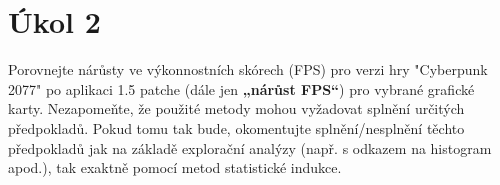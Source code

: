 \section*{Úkol 2}
\label{sec:task-2}

Porovnejte nárůsty ve výkonnostních skórech (FPS) pro verzi hry "Cyberpunk 2077" po aplikaci 1.5 patche (dále jen \textbf{„nárůst FPS“}) 
pro vybrané grafické karty. Nezapomeňte, že použité metody mohou vyžadovat splnění určitých předpokladů. Pokud tomu tak bude, okomentujte 
splnění/nesplnění těchto předpokladů jak na základě explorační analýzy (např. s odkazem na histogram apod.), tak exaktně pomocí metod statistické indukce.

\newcommand{\lowerThanZero}{$<$$<$ 0.001}

\newcommand{\shapireWilk}{0.006, 0.019}
\newcommand{\symmetryTest}{0.218, 0.016}
\newcommand{\ttValues}{5.663, "inf", 5.092, "inf"}
\newcommand{\rtxInterval}{(\tableValue{\ttValues}{0}, \tableValue{\ttValues}{1}) }
\newcommand{\amdInterval}{(\tableValue{\ttValues}{2}, \tableValue{\ttValues}{3}) }

\newcommand{\pointGuess}{0.400}
\newcommand{\wilcoxLeftSidedInterval}{$(0.400, \infty)$}

